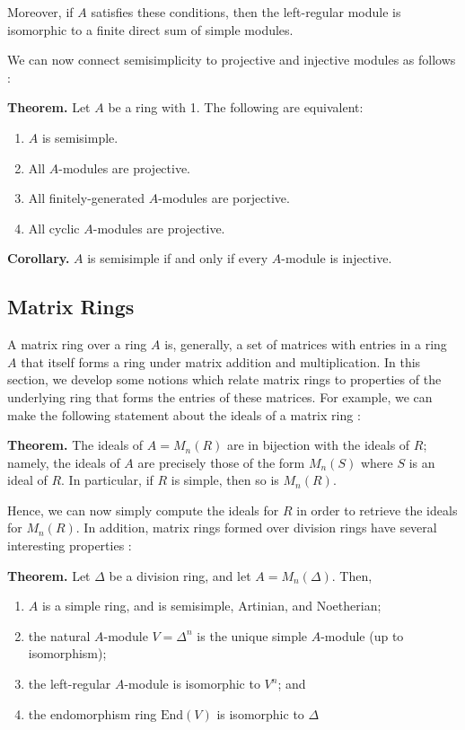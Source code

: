 \documentclass[11pt, reqno]{amsart}
\theoremstyle{plain}
\theoremstyle{definition}
\theoremstyle{example}
\def\End{\mathrm{End}}
\begin{document}
Moreover, if $A$ satisfies these conditions, then the left-regular module is isomorphic to a finite direct sum of simple modules.

\par
We can now connect semisimplicity to projective and injective modules as follows \cite[Lec. 18, p. 4]{dau}:

\par
\textbf{Theorem.} Let $A$ be a ring with 1. The following are equivalent:
\begin{enumerate}
\item $A$ is semisimple.
\item All $A$-modules are projective.
\item All finitely-generated $A$-modules are porjective.
\item All cyclic $A$-modules are projective.
\end{enumerate}

\par
\textbf{Corollary.} $A$ is semisimple if and only if every $A$-module is injective.



\subsection{Matrix Rings}

A matrix ring over a ring $A$ is, generally, a set of matrices with entries in a ring $A$ that itself forms a ring under matrix addition and multiplication. In this section, we develop some notions which relate matrix rings to properties of the underlying ring that forms the entries of these matrices. For example, we can make the following statement about the ideals of a matrix ring \cite[Lec. 19, p. 1]{dau}:

\par
\textbf{Theorem.} The ideals of $A = M_n(R)$ are in bijection with the ideals of $R$; namely, the ideals of $A$ are precisely those of the form $M_n(S)$ where $S$ is an ideal of $R$. In particular, if $R$ is simple, then so is $M_n(R)$.

\par
Hence, we can now simply compute the ideals for $R$ in order to retrieve the ideals for $M_n(R)$. In addition, matrix rings formed over division rings have several interesting properties \cite[Lec. 19, p. 3]{dau}:

\par
\textbf{Theorem.} Let $\Delta$ be a division ring, and let $A = M_n(\Delta)$. Then,
\begin{enumerate}
\item $A$ is a simple ring, and is semisimple, Artinian, and Noetherian;
\item the natural $A$-module $V = \Delta^n$ is the unique simple $A$-module (up to isomorphism);
\item the left-regular $A$-module is isomorphic to $V^n$; and
\item the endomorphism ring $\End(V)$ is isomorphic to $\Delta$
\end{enumerate}
\end{document}
